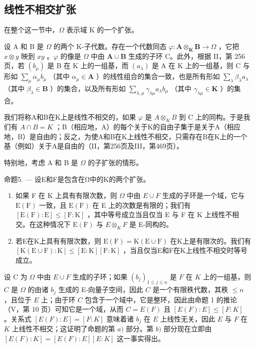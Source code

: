\subsection{线性不相交扩张}

在整个这一节中，\(\Omega\) 表示域 K 的一个扩张。

设 A 和 B 是 \(\Omega\) 的两个 K-子代数。存在一个代数同态 \(\varphi: \mathbf{A} \otimes_{\mathbf{K}} \mathbf{B} \to \Omega\) ，它把 \(x \otimes y\) 映到 \(xy\) 。\(\varphi\) 的像是 \(\Omega\) 中由 \(\mathbf{A} \cup \mathbf{B}\) 生成的子环 C。此外，根据 II，第 256 页，若 \((b_{\mu})\) 是 B 在 K 上的一组基，而 \((a_{\lambda})\) 是 A 在 K 上的一组基，则 C 与形如 \(\sum_{\mu} \alpha_{\mu} b_{\mu}\) （其中 \(\alpha_{\mu} \in \mathbf{A}\) ）的线性组合的集合一致，也是所有形如 \(\sum_{\lambda} \beta_{\lambda} a_{\lambda}\) （其中 \(\beta_{\lambda} \in \mathbf{B}\) ）的集合，以及所有形如 \(\sum_{\lambda, \mu} \gamma_{\lambda \mu} a_{\lambda} b_{\mu}\) （其中 \(\gamma_{\lambda \mu} \in \mathbf{K}\) ）的集合。

我们将称A和B在K上是线性不相交的，如果 \(\varphi\) 是 \(A \otimes_{K} B\) 到 C 上的同构。于是我们有 \(A \cap B = K\) ；B（相应地，A）的每个关于K的自由子集于是关于A（相应地，B）是自由的；反之，为使A和B在K上线性不相交，只需存在B在K上的一个基（例如）关于A是自由的（II，第256页及III，第469页）。

特别地，考虑 A 和 B 是 \(\Omega\) 的子扩张的情形。

命题5. --- 设E和F是包含在Ω中的K的两个扩张。

\begin{enumerate}
\def\labelenumi{\alph{enumi})}
\item
  如果 F 在 K 上具有有限次数，则 \(\Omega\) 中由 \(E \cup F\) 生成的子环是一个域，它与 \(\mathrm{E}(\mathrm{F})\) 一致，且 \(\mathrm{E}(\mathrm{F})\) 在 E 上的次数是有限的；我们有 \([\mathrm{E}(\mathrm{F}):\mathrm{E}] \leqslant [\mathrm{F}:\mathrm{K}]\) ，其中等号成立当且仅当 E 与 F 在 K 上线性不相交。在这种情况下 \(\mathrm{E}(\mathrm{F})\) 与 \(E \otimes_{K} F\) 是 E-同构的。
\item
  若E在K上具有有限次数，则 \(\mathrm{E}(\mathrm{F})=\mathrm{K}(\mathrm{E}\cup\mathrm{F})\) 在K上是有限次的。我们有 \([\mathrm{K}(\mathrm{E}\cup\mathrm{F}):\mathrm{K}]\leqslant[\mathrm{E}:\mathrm{K}][\mathrm{F}:\mathrm{K}]\) ，当且仅当E和F在K上线性不相交时等号成立。
\end{enumerate}

设 C 为 \(\Omega\) 中由 \(E \cup F\) 生成的子环；如果 \((b_j)_{1 \leq j \leq n}\) 是 \(F\) 在 \(K\) 上的一组基，则 \(C\) 是 \(\Omega\) 的由诸 \(b_j\) 生成的 E-向量子空间，因此 \(C\) 是一个有限秩代数，其秩 \(\leq n\) ，且位于 \(E\) 上；由于环 \(C\) 包含于一个域中，它是整环，因此由命题 1 的推论（V，第 10 页）可知它是一个域，从而 \(C = E(F)\) 且 \([E(F):E] \leq [F:K]\) 。关系式 \([E(F):E] = [F:K]\) 意味着诸 \(b_j\) 在 \(E\) 上线性无关，因此 \(E\) 与 \(F\) 在 \(K\) 上线性不相交；这证明了命题的第 \(a)\) 部分。第 \(b)\) 部分现在立即由 \([E(F):K] = [E(F):E][E:K]\) 这一事实得出。

